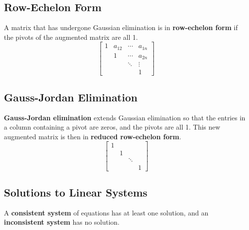 \documentclass{article}
\begin{document}
\subsection{Row-Echelon Form}
\begin{definition}
    A matrix that has undergone Gaussian elimination is in
    \textbf{row-echelon form} if the pivots of the augmented matrix are
    all 1.
    \begin{equation*}
        \begin{bmatrix}
            1 & a_{12} & \cdots & a_{1n} \\
              & 1      & \cdots & a_{2n} \\
              &        & \ddots & \vdots \\
              &        &        & 1
        \end{bmatrix}
    \end{equation*}
\end{definition}
\subsection{Gauss-Jordan Elimination}
\begin{definition}
    \textbf{Gauss-Jordan elimination} extends Gaussian elimination so
    that the entries in a column containing a pivot are zeros, and the
    pivots are all 1. This new augmented matrix is then in
    \textbf{reduced row-echelon form}.
    \begin{equation*}
        \begin{bmatrix}
            1 &   &        &   \\
              & 1 &        &   \\
              &   & \ddots &   \\
              &   &        & 1
        \end{bmatrix}
    \end{equation*}
\end{definition}
\subsection{Solutions to Linear Systems}
\begin{definition}
    A \textbf{consistent system} of equations has at least one solution,
    and an \linebreak \textbf{inconsistent system} has no solution.
\end{definition}
\newpage
\end{document}
